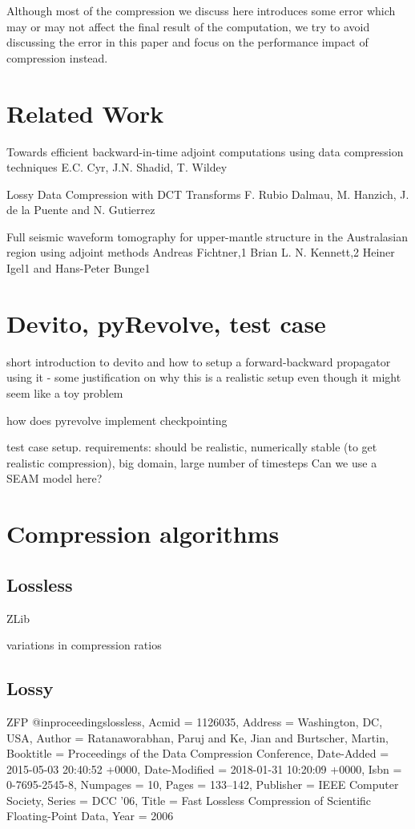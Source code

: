 \documentclass[conference]{IEEEtran}
\begin{document}
Although most of the compression we discuss here introduces some error which may or may not affect
the final result of the computation, we try to avoid discussing the error in this paper and focus on the 
performance impact of compression instead.

\section{Related Work}



Towards efficient backward-in-time adjoint computations using data
compression techniques E.C. Cyr, J.N. Shadid, T. Wildey

Lossy Data Compression with DCT Transforms F. Rubio Dalmau,
M. Hanzich, J. de la Puente and N. Gutierrez 

Full seismic waveform tomography for upper-mantle structure in the
Australasian region using adjoint methods
Andreas Fichtner,1 Brian L. N. Kennett,2 Heiner Igel1 and Hans-Peter
Bunge1


\section{Devito, pyRevolve, test case}
short introduction to devito and how to setup a forward-backward
propagator using it - some justification on why this is a realistic
setup even though it might seem like a toy problem

how does pyrevolve implement checkpointing

test case setup.
requirements: should be realistic, numerically stable (to get
realistic compression), big domain,
large number of timesteps
Can we use a SEAM model here?

\section{Compression algorithms}
\subsection{Lossless}
ZLib

variations in compression ratios
\subsection{Lossy}
ZFP
@inproceedings{lossless,
    Acmid = {1126035},
    Address = {Washington, DC, USA},
    Author = {Ratanaworabhan, Paruj and Ke, Jian and Burtscher, Martin},
    Booktitle = {Proceedings of the Data Compression Conference},
    Date-Added = {2015-05-03 20:40:52 +0000},
    Date-Modified = {2018-01-31 10:20:09 +0000},
    Isbn = {0-7695-2545-8},
    Numpages = {10},
    Pages = {133--142},
    Publisher = {IEEE Computer Society},
    Series = {DCC '06},
    Title = {Fast Lossless Compression of Scientific Floating-Point Data},
    Year = {2006}}
\end{document}
